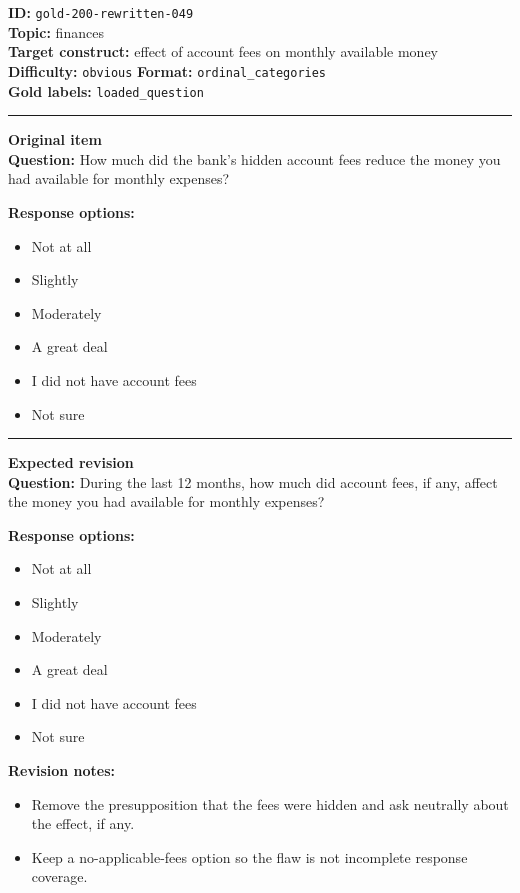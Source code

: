 \documentclass[10pt,a4paper]{article}
\newcommand{\sectionline}{\vspace{0.15em}\hrule\vspace{0.35em}}
\begin{document}
\begin{tcolorbox}[colframe=FlawRed,colback=white,colbacktitle=FlawRed!9,coltitle=black,title={Item 049\hfill Flawed item}]
\textbf{ID:} \texttt{gold-200-rewritten-049}\\
\textbf{Topic:} finances\\
\textbf{Target construct:} effect of account fees on monthly available money\\
\textbf{Difficulty:} \texttt{obvious} \quad \textbf{Format:} \texttt{ordinal\_categories}\\
\textbf{Gold labels:} \texttt{loaded\_question}\\
\sectionline
\textbf{Original item}\\
\textbf{Question:} How much did the bank's hidden account fees reduce the money you had available for monthly expenses?
\par\textbf{Response options:}
\begin{itemize}
\item Not at all
\item Slightly
\item Moderately
\item A great deal
\item I did not have account fees
\item Not sure
\end{itemize}
\sectionline
\textbf{Expected revision}\\
\textbf{Question:} During the last 12 months, how much did account fees, if any, affect the money you had available for monthly expenses?
\par\textbf{Response options:}
\begin{itemize}
\item Not at all
\item Slightly
\item Moderately
\item A great deal
\item I did not have account fees
\item Not sure
\end{itemize}
\par\textbf{Revision notes:}
\begin{itemize}
\item Remove the presupposition that the fees were hidden and ask neutrally about the effect, if any.
\item Keep a no-applicable-fees option so the flaw is not incomplete response coverage.
\end{itemize}
\end{tcolorbox}
\end{document}
